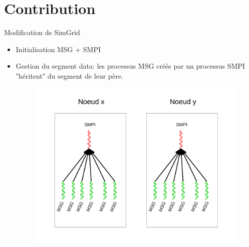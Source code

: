 \documentclass[11pt,xcolor=dvipsnames,presentation]{beamer}
\begin{document}
\section{Contribution}
\label{sec-4}
\begin{frame}[label=sec-4-1]{Modification de SimGrid}
\begin{itemize}
\item Initialisation MSG + SMPI
\item Gestion du segment data: les processus MSG créés par un processus
SMPI "héritent" du segment de leur père.
\begin{figure}[tbh]
\centering
\vspace{-1.5mm}
   \includegraphics[height=.7\paperheight]{../Img/Processus.pdf}
\end{figure}
\end{itemize}
\end{frame}
\end{document}
